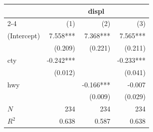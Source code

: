 \begin{tabular}{lrrr}
\toprule
            &     \multicolumn{3}{c}{displ}     \\ 
\cmidrule(lr){2-4} 
            &       (1) &       (2) &       (3) \\ 
\midrule
(Intercept) &  7.558*** &  7.368*** &  7.565*** \\ 
            &   (0.209) &   (0.221) &   (0.211) \\ 
cty         & -0.242*** &           & -0.233*** \\ 
            &   (0.012) &           &   (0.041) \\ 
hwy         &           & -0.166*** &    -0.007 \\ 
            &           &   (0.009) &   (0.029) \\ 
\midrule
$N$         &       234 &       234 &       234 \\ 
$R^2$       &     0.638 &     0.587 &     0.638 \\ 
\bottomrule
\end{tabular}
